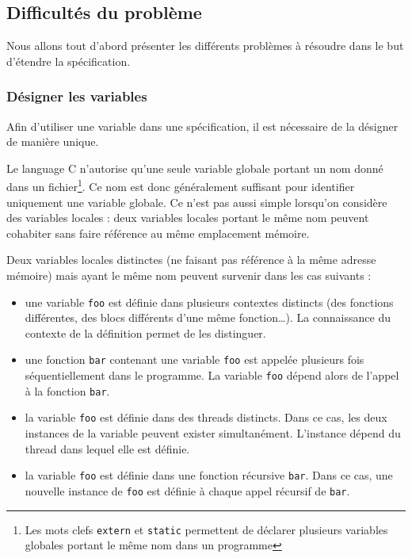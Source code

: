 \subsection{Difficultés du problème}

Nous allons tout d'abord présenter les différents problèmes à résoudre
dans le but d'étendre la spécification.

\subsubsection{Désigner les variables}

Afin d'utiliser une variable dans une spécification, il est nécessaire
de la désigner de manière unique.

Le language C n'autorise qu'une seule variable globale portant un nom
donné dans un fichier\footnote{Les mots clefs \lstinline!extern! et
\lstinline!static! permettent de déclarer plusieurs variables globales
portant le même nom dans un programme}. Ce nom est donc généralement
suffisant pour identifier uniquement une variable globale. Ce n'est pas
aussi simple lorsqu'on considère des variables locales : deux variables
locales portant le même nom peuvent cohabiter sans faire référence au
même emplacement mémoire.

Deux variables locales distinctes (ne faisant pas référence à la même
adresse mémoire) mais ayant le même nom peuvent survenir dans les cas
suivants :

\begin{itemize}
\item
  une variable \lstinline!foo! est définie dans plusieurs contextes
  distincts (des fonctions différentes, des blocs différents d'une même
  fonction\ldots{}). La connaissance du contexte de la définition permet
  de les distinguer.
\item
  une fonction \lstinline!bar! contenant une variable \lstinline!foo!
  est appelée plusieurs fois séquentiellement dans le programme. La
  variable \lstinline!foo! dépend alors de l'appel à la fonction
  \lstinline!bar!.
\item
  la variable \lstinline!foo! est définie dans des threads distincts.
  Dans ce cas, les deux instances de la variable peuvent exister
  simultanément. L'instance dépend du thread dans lequel elle est
  définie.
\item
  la variable \lstinline!foo! est définie dans une fonction récursive
  \lstinline!bar!. Dans ce cas, une nouvelle instance de \lstinline!foo!
  est définie à chaque appel récursif de \lstinline!bar!.
\end{itemize}

